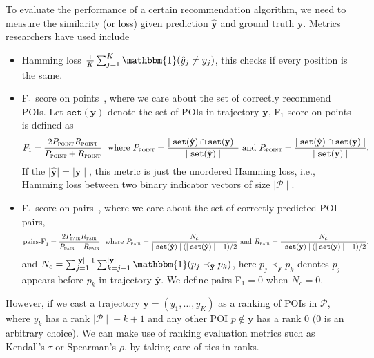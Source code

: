 To evaluate the performance of a certain recommendation algorithm,
we need to measure the similarity (or loss) given prediction $\hat{\mathbf{y}}$ and ground truth $\mathbf{y}$.
Metrics researchers have used include
\begin{itemize}
\item Hamming loss $\frac{1}{K} \sum_{j=1}^K \mathbbm{1}(\hat{y}_j \neq y_j)$, this checks if every position is the same.

\item F$_1$ score on points~\cite{ijcai15}, where we care about the set of correctly recommend POIs. 
      Let $\texttt{set}(\mathbf{y})$ denote the set of POIs in trajectory $\mathbf{y}$, F$_1$ score on points is defined as
\begin{equation*}
F_1 = \frac{2  P_{\textsc{point}}  R_{\textsc{point}}}{P_{\textsc{point}} + R_{\textsc{point}}} ~~\text{where}~
P_{\textsc{point}} = \frac{\mid \texttt{set}(\hat{\mathbf{y}}) \cap \texttt{set}(\mathbf{y}) \mid}{\mid \texttt{set}(\hat{\mathbf{y}}) \mid}~\text{and}~
R_{\textsc{point}} = \frac{\mid \texttt{set}(\hat{\mathbf{y}}) \cap \texttt{set}(\mathbf{y}) \mid}{\mid \texttt{set}(\mathbf{y}) \mid}.
\end{equation*}
If the $\mid\!\! \hat{\mathbf{y}} \!\!\mid = \mid\!\! \mathbf{y} \!\!\mid$, this metric is just the unordered Hamming loss, 
i.e., Hamming loss between two binary indicator vectors of size $\mid\!\! \mathcal{P} \!\!\mid$.


\item F$_1$ score on pairs~\cite{cikm16paper}, where we care about the set of correctly predicted POI pairs,
\begin{equation*}
\text{pairs-F}_1 = \frac{2 P_{\textsc{pair}} R_{\textsc{pair}}}{P_{\textsc{pair}} + R_{\textsc{pair}}}~~\text{where}~
P_{\textsc{pair}} = \frac{N_c} {\mid \texttt{set}(\hat{\mathbf{y}}) \mid (\mid \texttt{set}(\hat{\mathbf{y}}) \mid - 1) / 2}~\text{and}~
R_{\textsc{pair}} = \frac{N_c} {\mid \texttt{set}(\mathbf{y}) \mid (\mid \texttt{set}(\mathbf{y}) \mid - 1) / 2},
\end{equation*}
and $N_c = \sum_{j=1}^{\mid \mathbf{y} \mid - 1} \sum_{k=j+1}^{\mid \mathbf{y} \mid} \mathbbm{1}(p_j \prec_{\bar{\mathbf{y}}} p_k)$,
here $p_j \prec_{\bar{\mathbf{y}}} p_k$ denotes $p_j$ appears before $p_k$ in trajectory $\bar{\mathbf{y}}$.
We define pairs-F$_1 = 0$ when $N_c = 0$.

\end{itemize}

However, if we cast a trajectory $\mathbf{y} = (y_1,\dots,y_K)$ as a ranking of POIs in $\mathcal{P}$,
where $y_k$ has a rank $\mid\!\! \mathcal{P} \!\!\mid\! - k + 1$ and any other POI $p \notin \mathbf{y}$ has a rank $0$ ($0$ is an arbitrary choice).
We can make use of ranking evaluation metrics such as Kendall's $\tau$ or Spearman's $\rho$, by taking care of ties in ranks.

